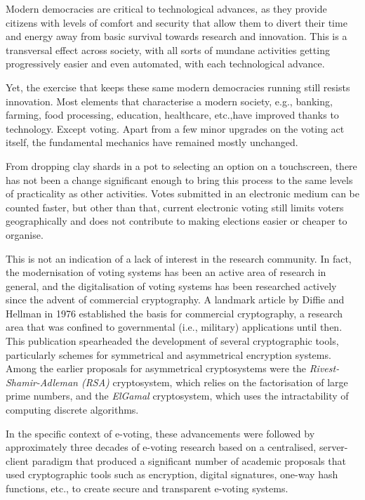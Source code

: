 \documentclass[../main.tex]{subfiles}
\begin{document}
Modern democracies are critical to technological advances, as they provide citizens with levels of comfort and security that allow them to divert their time and energy away from basic survival towards research and innovation. This is a transversal effect across society, with all sorts of mundane activities getting progressively easier and even automated, with each technological advance.
\par
Yet, the exercise that keeps these same modern democracies running still resists innovation. Most elements that characterise a modern society, e.g., banking, farming, food processing, education, healthcare, etc.,have improved thanks to technology. Except voting. Apart from a few minor upgrades on the voting act itself, the fundamental mechanics have remained mostly unchanged.
\par
From dropping clay shards in a pot to selecting an option on a touchscreen, there has not been a change significant enough to bring this process to the same levels of practicality as other activities. Votes submitted in an electronic medium can be counted faster, but other than that, current electronic voting still limits voters geographically and does not contribute to making elections easier or cheaper to organise.
\par
This is not an indication of a lack of interest in the research community. In fact, the modernisation of voting systems has been an active area of research in general, and the digitalisation of voting systems has been researched actively since the advent of commercial cryptography. A landmark article by Diffie and Hellman in 1976 \cite{Diffie1976} established the basis for commercial cryptography, a research area that was confined to governmental (i.e., military) applications until then. This publication spearheaded the development of several cryptographic tools, particularly schemes for symmetrical and asymmetrical encryption systems. Among the earlier proposals for asymmetrical cryptosystems were the \textit{Rivest-Shamir-Adleman (RSA)} \cite{Rivest1983} cryptosystem, which relies on the factorisation of large prime numbers, and the \textit{ElGamal} \cite{ElGamal1984} cryptosystem, which uses the intractability of computing discrete algorithms.
\par
In the specific context of e-voting, these advancements were followed by approximately three decades of e-voting research based on a centralised, server-client paradigm that produced a significant number of academic proposals that used cryptographic tools such as encryption, digital signatures, one-way hash functions, etc., to create secure and transparent e-voting systems.
\end{document}
